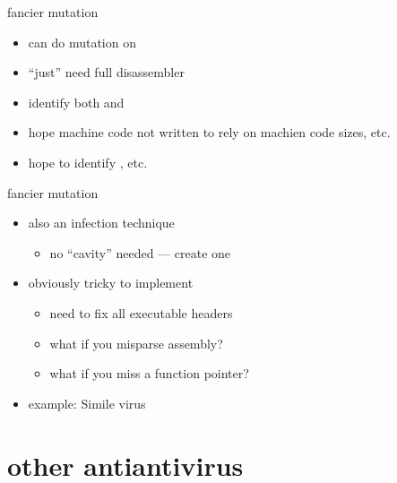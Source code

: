 \begin{frame}[fragile,label=fancyMut]{fancier mutation}
    \begin{itemize}
    \item can do mutation on 
    \vspace{.5cm}
    \item ``just'' need full disassembler
    \item identify both  and 
    \item hope machine code not written to rely on machien code sizes, etc.
    \item hope to identify , etc.
    \end{itemize}
\end{frame}

\begin{frame}{fancier mutation}
    \begin{itemize}
    \item also an infection technique
        \begin{itemize}
        \item no ``cavity'' needed --- create one
        \end{itemize}
    \item obviously tricky to implement
        \begin{itemize}
        \item need to fix all executable headers
        \item what if you misparse assembly?
        \item what if you miss a function pointer?
        \end{itemize}
    \item example: Simile virus
    \end{itemize}
\end{frame}

\section{other antiantivirus}

